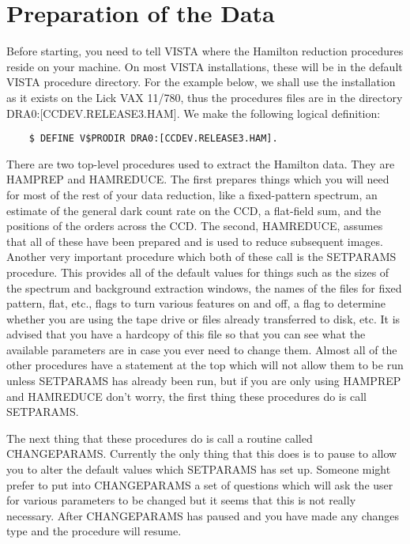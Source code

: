 
\section{Preparation of the Data}
\label{sec:hamprep}

Before starting, you need to tell VISTA where the Hamilton reduction
procedures reside on your machine.  On most VISTA installations, these will be
in the default VISTA procedure directory.  For the example below, we shall use
the installation as it exists on the Lick VAX 11/780, thus the procedures
files are in the directory DRA0:[CCDEV.RELEASE3.HAM].  We make the following
logical definition:

\begin{verbatim}
    $ DEFINE V$PRODIR DRA0:[CCDEV.RELEASE3.HAM].
\end{verbatim}

\noindent There are two top-level procedures used to extract the Hamilton
data.  They are {\tenit HAMPREP} and {\tenit HAMREDUCE}.  The first prepares
things which you will need for most of the rest of your data reduction, like a
fixed-pattern spectrum, an estimate of the general dark count rate on the CCD,
a flat-field sum, and the positions of the orders across the CCD.  The second,
{\tenit HAMREDUCE}, assumes that all of these have been prepared and is used
to reduce subsequent images.  Another very important procedure which both of
these call is the {\tenit SETPARAMS} procedure.  This provides all of the
default values for things such as the sizes of the spectrum and background
extraction windows, the names of the files for fixed pattern, flat, etc.,
flags to turn various features on and off, a flag to determine whether you are
using the tape drive or files already transferred to disk, etc.  It is advised
that you have a hardcopy of this file so that you can see what the available
parameters are in case you ever need to change them.  Almost all of the other
procedures have a statement at the top which will not allow them to be run
unless {\tenit SETPARAMS} has already been run, but if you are only using
{\tenit HAMPREP} and {\tenit HAMREDUCE} don't worry, the first thing these
procedures do is call {\tenit SETPARAMS}.

The next thing that these procedures do is call a routine called {\tenit
CHANGEPARAMS}. Currently the only thing that this does is to pause to allow
you to alter the default values which {\tenit SETPARAMS} has set up. Someone
might prefer to put into {\tenit CHANGEPARAMS} a set of questions which will
ask the user for various parameters to be changed but it seems that this is
not really necessary. After {\tenit CHANGEPARAMS} has paused and you have made
any changes type  and the procedure will resume.


